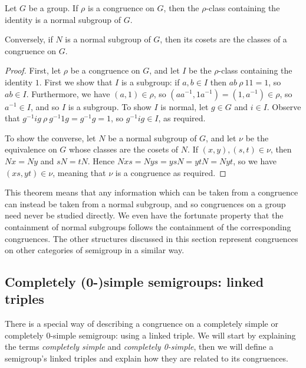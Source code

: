 \begin{theorem}
  \label{thm:normal-subgroups}
  Let $G$ be a group.  If $\rho$ is a congruence on $G$, then the $\rho$-class
  containing the identity is a normal subgroup of $G$.

  Conversely, if $N$ is a normal subgroup of $G$, then its cosets are the
  classes of a congruence on $G$.

  \begin{proof}
    First, let $\rho$ be a congruence on $G$, and let $I$ be the $\rho$-class
    containing the identity $1$.  First we show that $I$ is a subgroup: if
    $a,b \in I$ then $ab ~\rho~ 11 = 1$, so $ab \in I$.
    Furthermore, we have $(a,1) \in \rho$, so
    $(aa^{-1}, 1a^{-1}) = (1, a^{-1}) \in \rho$, so $a^{-1} \in I$, and so
    $I$ is a subgroup.  To show $I$ is normal, let $g \in G$ and $i \in I$.
    Observe that $g^{-1}ig ~\rho~ g^{-1}1g = g^{-1}g = 1$, so $g^{-1}ig \in I$,
    as required.

    To show the converse, let $N$ be a normal subgroup of $G$, and let $\nu$ be
    the equivalence on $G$ whose classes are the cosets of $N$.  If
    $(x,y), (s,t) \in \nu$, then $Nx=Ny$ and $sN=tN$.  Hence
    $Nxs=Nys=ysN=ytN=Nyt$, so we have $(xs,yt) \in \nu$, meaning that $\nu$ is
    a congruence as required.
  \end{proof}
\end{theorem}

This theorem means that any information which can be taken from a congruence can
instead be taken from a normal subgroup, and so congruences on a group need
never be studied directly.  We even have the fortunate property that the
containment of normal subgroups follows the containment of the corresponding
congruences.  The other structures discussed in this section represent
congruences on other categories of semigroup in a similar way.



\subsection{Completely (0-)simple semigroups: linked triples}
\label{sec:linked-triples}

There is a special way of describing a congruence on a completely simple or
completely 0-simple semigroup: using a linked triple.  We will start by
explaining the terms \textit{completely simple} and \textit{completely
  0-simple}, then we will define a semigroup's linked triples and explain how
they are related to its congruences.

